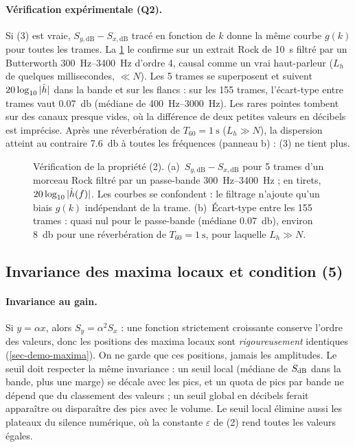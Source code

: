\paragraph{Vérification expérimentale (Q2).} Si (3) est vraie, $S_{y,\mathrm{dB}} -
S_{x,\mathrm{dB}}$ tracé en fonction de $k$ donne la même courbe $g(k)$ pour toutes les
trames. La \cref{fig-filtrage} le confirme sur un extrait Rock de \qty{10}{\second} filtré
par un Butterworth \qtyrange{300}{3400}{\hertz} d'ordre 4, causal comme un vrai
haut-parleur ($L_h$ de quelques millisecondes, $\ll N$). Les 5 trames se superposent et
suivent $20\log_{10}|\hat{h}|$ dans la bande et sur les flancs : sur les 155 trames, l'écart-type
entre trames vaut \qty{0.07}{\decibel} (médiane de \qtyrange{400}{3000}{\hertz}). Les rares
pointes tombent sur des canaux presque vides, où la différence de deux petites valeurs en
décibels est imprécise. Après une réverbération de $T_{60} = \qty{1}{\second}$
($L_h \gg N$), la dispersion atteint au contraire \qty{7.6}{\decibel} à toutes les fréquences
(panneau b) : (3) ne tient plus.

\begin{figure}[t]
  \centering
  \caption{Vérification de la propriété (2). (a)~$S_{y,\mathrm{dB}} - S_{x,\mathrm{dB}}$ pour
  5 trames d'un morceau Rock filtré par un passe-bande \qtyrange{300}{3400}{\hertz} ; en
  tirets, $20\log_{10}|\hat{h}(f)|$. Les courbes se confondent : le filtrage n'ajoute qu'un biais
  $g(k)$ indépendant de la trame. (b)~Écart-type entre les 155 trames : quasi nul pour le
  passe-bande (médiane \qty{0.07}{\decibel}), environ \qty{8}{\decibel} pour une
  réverbération de $T_{60} = \qty{1}{\second}$, pour laquelle $L_h \gg N$.}
  \label{fig-filtrage}
\end{figure}

\subsection{Invariance des maxima locaux et condition (5)}
\label{sec-maxima}

\paragraph{Invariance au gain.} Si $y = \alpha x$, alors $S_y = \alpha^2 S_x$ : une fonction
strictement croissante conserve l'ordre des valeurs, donc les positions des maxima locaux
sont \emph{rigoureusement} identiques (\cref{sec-demo-maxima}). On ne garde que ces
positions, jamais les amplitudes. Le seuil doit respecter la même invariance : un seuil
local (médiane de $S_{\mathrm{dB}}$ dans la bande, plus une marge) se décale avec les pics, et un quota
de pics par bande ne dépend que du classement des valeurs ; un seuil global en décibels ferait
apparaître ou disparaître des pics avec le volume. Le seuil local élimine aussi les plateaux
du silence numérique, où la constante $\varepsilon$ de (2) rend toutes les valeurs égales.

